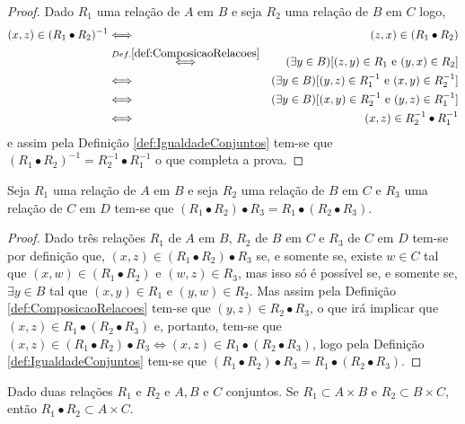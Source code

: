 \begin{proof}
	Dado $R_1$ uma relação de $A$ em $B$ e seja $R_2$ uma relação de $B$ em $C$ logo, 
	\begin{eqnarray*}
		(x, z) \in (R_1 \bullet R_2)^{-1} & \Longleftrightarrow & (z, x) \in (R_1 \bullet R_2)\\
		& \stackrel{Def. \ref{def:ComposicaoRelacoes}}{\Longleftrightarrow }& (\exists y \in B)[(z, y) \in R_1 \text{ e } (y, x) \in R_2]\\
		& \Longleftrightarrow & (\exists y \in B)[(y, z) \in R_1^{-1} \text{ e } (x, y) \in R_2^{-1}]\\
		& \Longleftrightarrow & (\exists y \in B)[(x, y) \in R_2^{-1} \text{ e }(y, z) \in R_1^{-1} ]\\
		& \Longleftrightarrow & (x, z) \in R_2^{-1} \bullet R_1^{-1}
	\end{eqnarray*} 
	e assim pela Definição \ref{def:IgualdadeConjuntos} tem-se que $(R_1 \bullet R_2)^{-1} = R_2^{-1} \bullet R_1^{-1}$ o que completa a prova.
\end{proof}

\begin{theorem}
	Seja $R_1$ uma relação de $A$ em $B$ e seja $R_2$ uma relação de $B$ em $C$ e $R_3$ uma relação de $C$ em $D$ tem-se que $(R_1 \bullet R_2) \bullet R_3 = R_1 \bullet (R_2 \bullet R_3)$.
\end{theorem}

\begin{proof}
	Dado três relações $R_1$ de $A$ em $B$, $R_2$ de $B$ em $C$ e $R_3$ de $C$ em $D$ tem-se por definição que, $(x, z) \in (R_1 \bullet R_2) \bullet R_3$ se, e somente se, existe $w \in C$ tal que $(x, w) \in (R_1 \bullet R_2)$ e $(w, z) \in R_3$, mas isso só é possível se, e somente se, $\exists y \in B$ tal que $(x, y) \in R_1$ e $(y, w) \in R_2$. Mas assim pela Definição \ref{def:ComposicaoRelacoes} tem-se que $(y, z) \in R_2 \bullet R_3$, o que irá implicar que $(x, z) \in R_1 \bullet (R_2 \bullet R_3)$ e, portanto, tem-se que $(x, z) \in (R_1 \bullet R_2) \bullet R_3 \Longleftrightarrow (x, z) \in R_1 \bullet (R_2 \bullet R_3)$, logo pela Definição \ref{def:IgualdadeConjuntos} tem-se que $(R_1 \bullet R_2) \bullet R_3 = R_1 \bullet (R_2 \bullet R_3)$.
\end{proof}

\begin{theorem}
	Dado duas relações $R_1$ e $R_2$ e $A, B$ e $C$ conjuntos. Se $R_1 \subset A \times B$ e $R_2 \subset B \times C$, então $R_1 \bullet R_2 \subset A \times C$.
\end{theorem}

